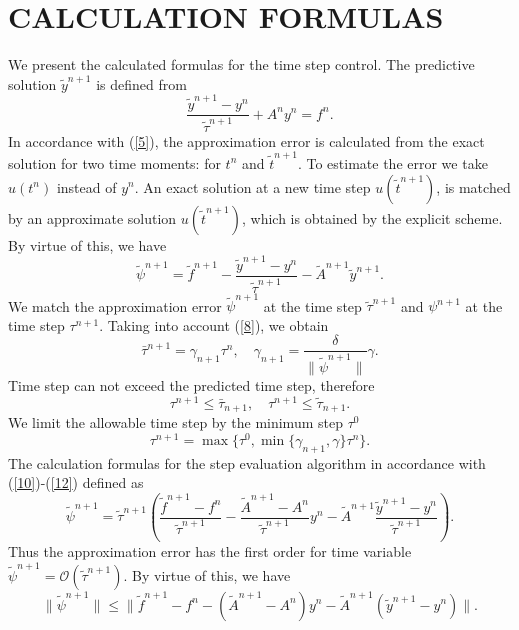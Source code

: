 \documentclass{aip-cp}
\begin{document}
\section{CALCULATION FORMULAS}
We present the calculated formulas for the time step control. 
The predictive solution $\widetilde{y}^{n+1} $  is defined from
\[
  \frac{\widetilde{y}^{n+1} - y^{n}}{\widetilde{\tau}^{n+1}} + A^{n} y^{n} 
  = f^{n} .
\]
In accordance with (\ref{5}), the approximation error is calculated from the exact solution for two time moments: for $t^n$ and $\widetilde{t}^{n+1}$.
To estimate the error we take $u(t^n)$ instead of $y^n$. An exact solution at a new time step $u(\widetilde{t}^{n+1})$, is matched by an approximate solution $u(\widetilde{t}^{n+1})$, which is obtained by the explicit scheme. By virtue of this, we have
\begin{equation}\label{10}
 \widetilde{\psi}^{n+1}  = \widetilde{f}^{n+1} -
 \frac{\widetilde{y}^{n+1} - y^{n}}{\widetilde{\tau}^{n+1}} -
 \widetilde{A}^{n+1} \widetilde{y}^{n+1} . 
\end{equation} 
We match the approximation error $\widetilde{\psi}^{n+1}$ at the time step $\widetilde{\tau}^{n+1}$ and $\psi^{n+1}$ at the time step $\tau^{n+1}$.
Taking into account (\ref{8}), we obtain
\begin{equation}\label{11}
  \bar{\tau}^{n+1} = \gamma_{n+1} \tau^n,
  \quad \gamma_{n+1} = \frac{\delta}{\| \widetilde{\psi}^{n+1}\|}  \gamma.
\end{equation} 
Time step can not exceed the predicted time step, therefore
\[
\tau^{n+1} \leq \bar{\tau}_{n+1}, \quad \tau^{n+1} \leq \widetilde{\tau}_{n+1}.
\] 
We limit the allowable time step by the minimum step $\tau^0$
\begin{equation}\label{12}
 \tau^{n+1} = \max \big \{\tau^0, \min \{\gamma_{n+1}, \gamma \} \tau^n \big \}. 
\end{equation}
The calculation formulas for the step evaluation algorithm in accordance with (\ref{10})-(\ref{12}) defined as
\[
 \widetilde{\psi}^{n+1} = \widetilde{\tau}^{n+1} \left( \frac{\widetilde{f}^{n+1} - f^n}{\widetilde{\tau}^{n+1}}  - \frac{\widetilde{A}^{n+1} - A^n}{\widetilde{\tau}^{n+1}}  y^n - \widetilde{A}^{n+1} \frac{\widetilde{y}^{n+1} - y^n}{\widetilde{\tau}^{n+1}}  \right ) .
\] 
Thus the approximation error has the first order for
time variable
$
 \widetilde{\psi}^{n+1} = \mathcal{O} (\widetilde{\tau}^{n+1}) .
$ 
By virtue of this, we have 
\begin{equation}\label{13}
 \|\widetilde{\psi}^{n+1} \| \leq \|\widetilde{f}^{n+1} - f^n  -
 (\widetilde{A}^{n+1} - A^n) y^n -
 \widetilde{A}^{n+1} (\widetilde{y}^{n+1} - y^n) \| .
\end{equation} 
\end{document}
